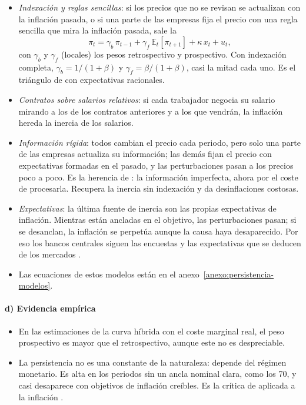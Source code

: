 \documentclass[11pt]{article}
\begin{document}
\begin{itemize}
\item \emph{Indexación y reglas sencillas}: si los precios que no se revisan se actualizan con la inflación pasada\nocite{ChristianoEichenbaumEvans2005}, o si una parte de las empresas fija el precio con una regla sencilla que mira la inflación pasada\nocite{GaliGertler1999Inflation}, sale la  
  \begin{equation}\label{eq:nkpc-hibrida}
  \pi_t=\gamma_b\,\pi_{t-1}+\gamma_f\,\mathbb{E}_t[\pi_{t+1}]+\kappa\,x_t+u_t ,
  \end{equation}
  con $\gamma_b$ y $\gamma_f$ (locales) los pesos retrospectivo y prospectivo. Con indexación completa, $\gamma_b=1/(1+\beta)$ y $\gamma_f=\beta/(1+\beta)$, casi la mitad cada uno. Es el triángulo de  con expectativas racionales.
\item \emph{Contratos sobre salarios relativos}: si cada trabajador negocia su salario mirando a los de los contratos anteriores y a los que vendrán, la inflación hereda la inercia de los salarios\nocite{FuhrerMoore1995Inflation}.
\item \emph{Información rígida}: todos cambian el precio cada periodo, pero solo una parte de las empresas actualiza su información; las demás fijan el precio con expectativas formadas en el pasado, y las perturbaciones pasan a los precios poco a poco\nocite{MankiwReis2002Sticky}. Es la herencia de : la información imperfecta, ahora por el coste de procesarla. Recupera la inercia sin indexación y da desinflaciones costosas.
\item \emph{Expectativas}: la última fuente de inercia son las propias expectativas de inflación. Mientras están ancladas en el objetivo, las perturbaciones pasan; si se desanclan, la inflación se perpetúa aunque la causa haya desaparecido. Por eso los bancos centrales siguen las encuestas y las expectativas que se deducen de los mercados .
\item Las ecuaciones de estos modelos están en el anexo~\ref{anexo:persistencia-modelos}.
\end{itemize}

\paragraph{d) Evidencia empírica}

\begin{itemize}
\item En las estimaciones de la curva híbrida con el coste marginal real, el peso prospectivo es mayor que el retrospectivo, aunque este no es despreciable\nocite{GaliGertler1999Inflation}.
\item La persistencia no es una constante de la naturaleza: depende del régimen monetario. Es alta en los periodos sin un ancla nominal clara, como los 70, y casi desaparece con objetivos de inflación creíbles\nocite{Benati2008Investigating}. Es la crítica de  aplicada a la inflación .
\end{itemize}
\end{document}
